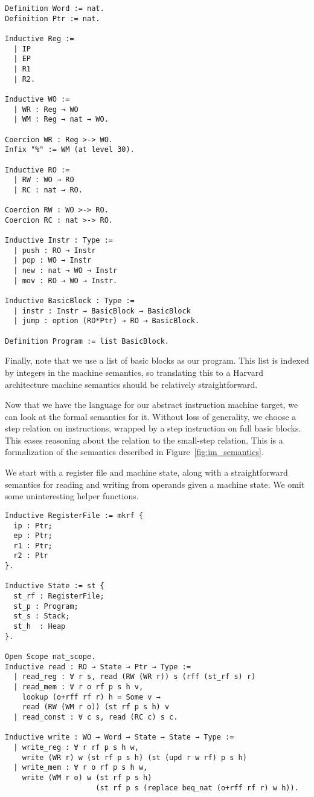 \begin{verbatim}
Definition Word := nat.
Definition Ptr := nat.

Inductive Reg := 
  | IP
  | EP
  | R1
  | R2.

Inductive WO := 
  | WR : Reg → WO
  | WM : Reg → nat → WO.

Coercion WR : Reg >-> WO.
Infix "%" := WM (at level 30).

Inductive RO := 
  | RW : WO → RO
  | RC : nat → RO.

Coercion RW : WO >-> RO.
Coercion RC : nat >-> RO.

Inductive Instr : Type :=
  | push : RO → Instr
  | pop : WO → Instr
  | new : nat → WO → Instr 
  | mov : RO → WO → Instr.

Inductive BasicBlock : Type :=
  | instr : Instr → BasicBlock → BasicBlock
  | jump : option (RO*Ptr) → RO → BasicBlock.

Definition Program := list BasicBlock.
\end{verbatim}

Finally, note that we use a list of basic blocks as our program. This list is
indexed by integers in the machine semantics, so translating this to a Harvard 
architecture machine semantics should be relatively straightforward. 

Now that we have the language for our abstract instruction machine target, we
can look at the formal semantics for it. Without loss of generality, we choose a
step relation on instructions, wrapped by a step instruction on full basic
blocks. This eases reasoning about the relation to the small-step \ce
relation. This is a formalization of the semantics described in
Figure~\ref{fig:im_semantics}. 

We start with a register file and machine state, along with a straightforward
semantics for reading and writing from operands given a machine state. We omit
some uninteresting helper functions. 

\begin{verbatim}
Inductive RegisterFile := mkrf {
  ip : Ptr;
  ep : Ptr;
  r1 : Ptr; 
  r2 : Ptr
}. 

Inductive State := st {
  st_rf : RegisterFile;
  st_p : Program;
  st_s : Stack;
  st_h  : Heap
}.

Open Scope nat_scope. 
Inductive read : RO → State → Ptr → Type :=
  | read_reg : ∀ r s, read (RW (WR r)) s (rff (st_rf s) r)
  | read_mem : ∀ r o rf p s h v, 
    lookup (o+rff rf r) h = Some v →
    read (RW (WM r o)) (st rf p s h) v
  | read_const : ∀ c s, read (RC c) s c.

Inductive write : WO → Word → State → State → Type :=
  | write_reg : ∀ r rf p s h w, 
    write (WR r) w (st rf p s h) (st (upd r w rf) p s h)
  | write_mem : ∀ r o rf p s h w, 
    write (WM r o) w (st rf p s h) 
                     (st rf p s (replace beq_nat (o+rff rf r) w h)).
\end{verbatim}

